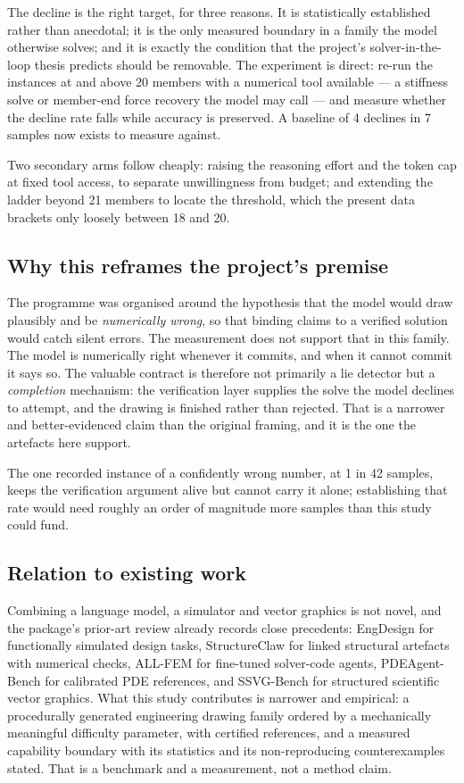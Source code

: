 \documentclass[11pt,a4paper]{article}
\begin{document}
The decline is the right target, for three reasons. It is statistically established rather than
anecdotal; it is the only measured boundary in a family the model otherwise solves; and it is exactly
the condition that the project's solver-in-the-loop thesis predicts should be removable. The experiment
is direct: re-run the instances at and above 20 members with a numerical tool available --- a stiffness
solve or member-end force recovery the model may call --- and measure whether the decline rate falls
while accuracy is preserved. A baseline of 4 declines in 7 samples now exists to measure against.

Two secondary arms follow cheaply: raising the reasoning effort and the token cap at fixed tool access,
to separate unwillingness from budget; and extending the ladder beyond 21 members to locate the
threshold, which the present data brackets only loosely between 18 and 20.

\subsection{Why this reframes the project's premise}

The programme was organised around the hypothesis that the model would draw plausibly and be
\emph{numerically wrong}, so that binding claims to a verified solution would catch silent errors. The
measurement does not support that in this family. The model is numerically right whenever it commits,
and when it cannot commit it says so. The valuable contract is therefore not primarily a lie detector
but a \emph{completion} mechanism: the verification layer supplies the solve the model declines to
attempt, and the drawing is finished rather than rejected. That is a narrower and better-evidenced
claim than the original framing, and it is the one the artefacts here support.

The one recorded instance of a confidently wrong number, at 1 in 42 samples, keeps the verification
argument alive but cannot carry it alone; establishing that rate would need roughly an order of
magnitude more samples than this study could fund.

\subsection{Relation to existing work}

Combining a language model, a simulator and vector graphics is not novel, and the package's prior-art
review already records close precedents: EngDesign for functionally simulated design tasks,
StructureClaw for linked structural artefacts with numerical checks, ALL-FEM for fine-tuned solver-code
agents, PDEAgent-Bench for calibrated PDE references, and SSVG-Bench for structured scientific vector
graphics. What this study contributes is narrower and empirical: a procedurally generated engineering
drawing family ordered by a mechanically meaningful difficulty parameter, with certified references, and
a measured capability boundary with its statistics and its non-reproducing counterexamples stated. That
is a benchmark and a measurement, not a method claim.
\end{document}
